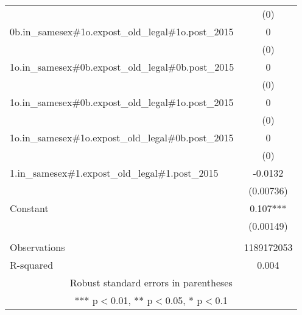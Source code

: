 \documentclass[]{article}
\begin{document}
\begin{tabular}{lc}
 & (0) \\
0b.in\_samesex\#1o.expost\_old\_legal\#1o.post\_2015 & 0 \\
 & (0) \\
1o.in\_samesex\#0b.expost\_old\_legal\#0b.post\_2015 & 0 \\
 & (0) \\
1o.in\_samesex\#0b.expost\_old\_legal\#1o.post\_2015 & 0 \\
 & (0) \\
1o.in\_samesex\#1o.expost\_old\_legal\#0b.post\_2015 & 0 \\
 & (0) \\
1.in\_samesex\#1.expost\_old\_legal\#1.post\_2015 & -0.0132 \\
 & (0.00736) \\
Constant & 0.107*** \\
 & (0.00149) \\
 &  \\
Observations & 1189172053 \\
 R-squared & 0.004 \\ \hline
\multicolumn{2}{c}{ Robust standard errors in parentheses} \\
\multicolumn{2}{c}{ *** p$<$0.01, ** p$<$0.05, * p$<$0.1} \\
\end{tabular}
\end{document}
